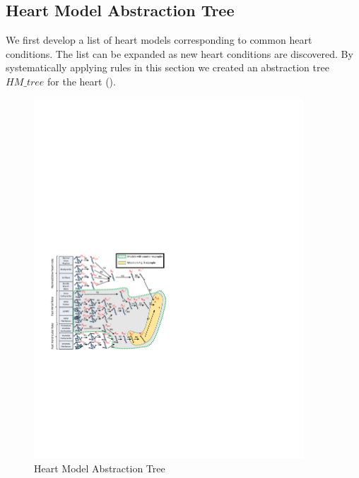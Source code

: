 \subsection{Heart Model Abstraction Tree}
We first develop a list of heart models corresponding to common heart conditions. The list can be expanded as new heart conditions are discovered.
By systematically applying rules in this section we created an abstraction tree $HM\_tree$ for the heart (). 
\begin{figure}[!t]
	\centering
	\includegraphics[width=0.9\textwidth]{figs/abs.pdf}
	\caption{\small Heart Model Abstraction Tree}
	\label{fig:HM_abs}
\end{figure}


